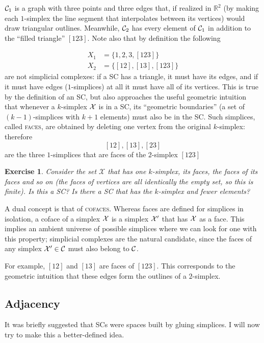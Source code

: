 \documentclass{tufte-handout}
\newtheorem{exercise}{Exercise}
\newcommand{\define}{\textsc}
\newcommand{\re}{\mathbb{R}}
\begin{document}
$\sc_1$ is a graph with three points and three edges that, if realized in $\re^2$ (by making each $1$-simplex the line segment that interpolates between its vertices) would draw triangular outlines. Meanwhile, $\sc_2$ has every element of $\sc_1$ in addition to the ``filled triangle'' $[123]$. Note also that by definition the following

\begin{align*}
    X_1 &= \{1,2,3,[123]\}\\
    X_2 &= \{[12],[13],[123]\}
\end{align*}
are not simplicial complexes: if a SC has a triangle, it must have its edges, and if it must have edges ($1$-simplices) at all it must have all of its vertices. This is true by the definition of an SC, but also approaches the useful geometric intuition that whenever a $k$-simplex $\se$ is in a SC, its ``geometric boundaries'' (a set of $(k-1)$-simplices with $k+1$ elements) must also be in the SC. Such simplices, called \define{faces}, are obtained by deleting one vertex from the original $k$-simplex: therefore
\[
[12],[13],[23]
\]
are the three $1$-simplices that are faces of the $2$-simplex $[123]$
\begin{exercise}
Consider the set $\mathcal X$ that has one $k$-simplex, its faces, the faces of its faces and so on (the faces of vertices are all identically the empty set, so this is finite). Is this a SC? Is there a SC that has the $k$-simplex and fewer elements?
\end{exercise}

A dual concept is that of \define{cofaces}. Whereas faces are defined for simplices in isolation, a coface of a simplex $\se$ is a simplex $\se'$ that has $\se$ as a face. This implies an ambient universe of possible simplices where we can look for one with this property; simplicial complexes are the natural candidate, since the faces of any simplex $\se'\in \sc$ must also belong to $\sc$. 

For example, $[12]$ and $[13]$ are faces of $[123]$. This corresponds to the geometric intuition that these edges form the outlines of a $2$-simplex.



\subsection{Adjacency}

It was briefly suggested that SCs were spaces built by gluing simplices. I will now try to make this a better-defined idea.
\end{document}
